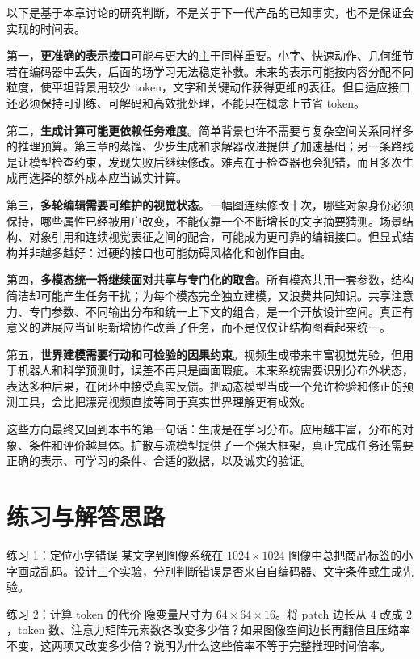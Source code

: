 以下是基于本章讨论的研究判断，不是关于下一代产品的已知事实，也不是保证会实现的时间表。

第一，\textbf{更准确的表示接口}可能与更大的主干同样重要。小字、快速动作、几何细节若在编码器中丢失，后面的场学习无法稳定补救。未来的表示可能按内容分配不同粒度，使平坦背景用较少 token，文字和关键动作获得更细的表征。但自适应接口还必须保持可训练、可解码和高效批处理，不能只在概念上节省 token。

第二，\textbf{生成计算可能更依赖任务难度}。简单背景也许不需要与复杂空间关系同样多的推理预算。第三章的蒸馏、少步生成和求解器改进提供了加速基础；另一条路线是让模型检查约束，发现失败后继续修改。难点在于检查器也会犯错，而且多次生成再选择的额外成本应当诚实计算。

第三，\textbf{多轮编辑需要可维护的视觉状态}。一幅图连续修改十次，哪些对象身份必须保持，哪些属性已经被用户改变，不能仅靠一个不断增长的文字摘要猜测。场景结构、对象引用和连续视觉表征之间的配合，可能成为更可靠的编辑接口。但显式结构并非越多越好：过硬的接口也可能妨碍风格化和创作自由。

第四，\textbf{多模态统一将继续面对共享与专门化的取舍}。所有模态共用一套参数，结构简洁却可能产生任务干扰；为每个模态完全独立建模，又浪费共同知识。共享注意力、专门参数、不同输出分布和统一上下文的组合，是一个开放设计空间。真正有意义的进展应当证明新增协作改善了任务，而不是仅仅让结构图看起来统一。

第五，\textbf{世界建模需要行动和可检验的因果约束}。视频生成带来丰富视觉先验，但用于机器人和科学预测时，误差不再只是画面瑕疵。未来系统需要识别分布外状态，表达多种后果，在闭环中接受真实反馈。把动态模型当成一个允许检验和修正的预测工具，会比把漂亮视频直接等同于真实世界理解更有成效。

这些方向最终又回到本书的第一句话：生成是在学习分布。应用越丰富，分布的对象、条件和评价越具体。扩散与流模型提供了一个强大框架，真正完成任务还需要正确的表示、可学习的条件、合适的数据，以及诚实的验证。

\section{练习与解答思路}
\label{sec:application-exercises}

\begin{exercisebox}{练习 1：定位小字错误}
某文字到图像系统在 $1024\times1024$ 图像中总把商品标签的小字画成乱码。设计三个实验，分别判断错误是否来自自编码器、文字条件或生成先验。
\end{exercisebox}

\begin{exercisebox}{练习 2：计算 token 的代价}
隐变量尺寸为 $64\times64\times16$。将 patch 边长从 $4$ 改成 $2$，token 数、注意力矩阵元素数各改变多少倍？如果图像空间边长再翻倍且压缩率不变，这两项又改变多少倍？说明为什么这些倍率不等于完整推理时间倍率。
\end{exercisebox}

